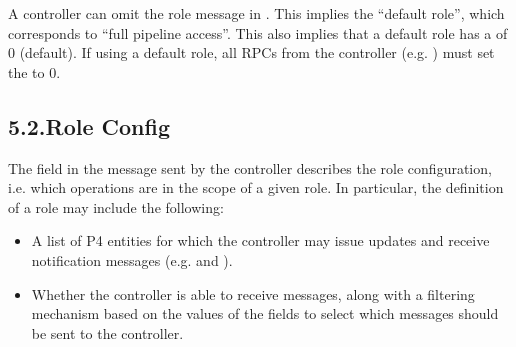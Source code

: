 \documentclass[11pt]{article}
\begin{document}
{%
\noindent{}A controller can omit the role message in . This
implies the \textquotedblleft{}default role\textquotedblright{}, which corresponds to \textquotedblleft{}full pipeline access\textquotedblright{}. This
also implies that a default role has a  of 0 (default). If using a
default role, all RPCs from the controller (e.g. ) must set the 
to 0.%

\subsection{5.2.\hspace*{0.5em}Role Config}\label{sec-arbitration-role-config}%

\noindent{}The  field in the  message sent by the
controller describes the role configuration, i.e. which operations are in the
scope of a given role. In particular, the definition of a role may include the
following:%

\begin{itemize}[noitemsep,topsep=\mdcompacttopsep]%

\item{}A list of P4 entities for which the controller may issue  updates and
receive notification messages (e.g.  and
).%

\item{}Whether the controller is able to receive  messages, along with a
filtering mechanism based on the values of the  fields to
select which  messages should be sent to the controller.%


\end{itemize}}
\end{document}

